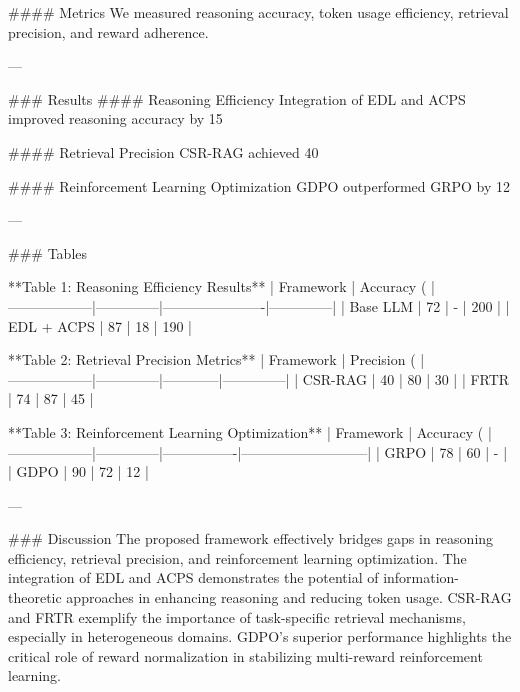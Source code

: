 #### Metrics  
We measured reasoning accuracy, token usage efficiency, retrieval precision, and reward adherence.  

---

### Results  
#### Reasoning Efficiency  
Integration of EDL and ACPS improved reasoning accuracy by 15%

#### Retrieval Precision  
CSR-RAG achieved 40%

#### Reinforcement Learning Optimization  
GDPO outperformed GRPO by 12%

---

### Tables  

**Table 1: Reasoning Efficiency Results**  
| Framework        | Accuracy (%
|------------------|--------------|----------------------|--------------|  
| Base LLM         | 72           | -                    | 200          |  
| EDL + ACPS       | 87           | 18                   | 190          |  

**Table 2: Retrieval Precision Metrics**  
| Framework        | Precision (%
|------------------|--------------|------------|--------------|  
| CSR-RAG          | 40           | 80         | 30           |  
| FRTR             | 74           | 87         | 45           |  

**Table 3: Reinforcement Learning Optimization**  
| Framework        | Accuracy (%
|------------------|--------------|----------------|---------------------------|  
| GRPO             | 78           | 60             | -                         |  
| GDPO             | 90           | 72             | 12                        |  

---

### Discussion  
The proposed framework effectively bridges gaps in reasoning efficiency, retrieval precision, and reinforcement learning optimization. The integration of EDL and ACPS demonstrates the potential of information-theoretic approaches in enhancing reasoning and reducing token usage. CSR-RAG and FRTR exemplify the importance of task-specific retrieval mechanisms, especially in heterogeneous domains. GDPO's superior performance highlights the critical role of reward normalization in stabilizing multi-reward reinforcement learning.  

